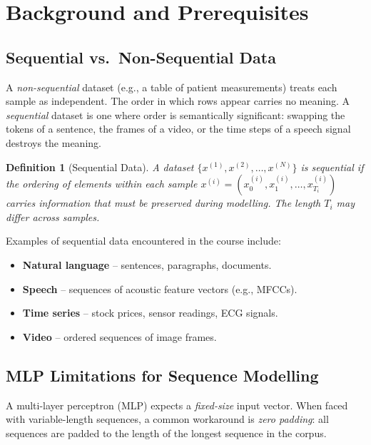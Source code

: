 \documentclass[12pt,a4paper]{article}
\newtheorem{definition}{Definition}[section]
\begin{document}
\section{Background and Prerequisites}
\label{sec:background}

\subsection{Sequential vs.\ Non-Sequential Data}
\label{subsec:seq_vs_nonseq}

A \emph{non-sequential} dataset (e.g., a table of patient measurements) treats
each sample as independent.  The order in which rows appear carries no meaning.
A \emph{sequential} dataset is one where order is semantically significant:
swapping the tokens of a sentence, the frames of a video, or the time steps of
a speech signal destroys the meaning.

\begin{definition}[Sequential Data]
\label{def:sequential}
A dataset $\{x^{(1)}, x^{(2)}, \ldots, x^{(N)}\}$ is \emph{sequential} if the
ordering of elements within each sample $x^{(i)} = (x^{(i)}_0, x^{(i)}_1,
\ldots, x^{(i)}_{T_i})$ carries information that must be preserved during
modelling.  The length $T_i$ may differ across samples.
\end{definition}

Examples of sequential data encountered in the course include:

\begin{itemize}[noitemsep]
  \item \textbf{Natural language} -- sentences, paragraphs, documents.
  \item \textbf{Speech} -- sequences of acoustic feature vectors (e.g., MFCCs).
  \item \textbf{Time series} -- stock prices, sensor readings, ECG signals.
  \item \textbf{Video} -- ordered sequences of image frames.
\end{itemize}

\subsection{MLP Limitations for Sequence Modelling}
\label{subsec:mlp_limits}

A multi-layer perceptron (MLP) expects a \emph{fixed-size} input vector.  When
faced with variable-length sequences, a common workaround is \emph{zero
padding}: all sequences are padded to the length of the longest sequence in the
corpus.
\end{document}
